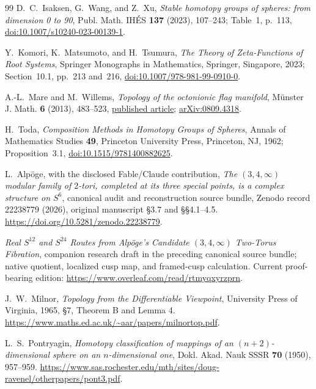 \documentclass[11pt]{article}
\theoremstyle{definition}
\begin{document}
\begin{thebibliography}{99}
D.~C.~Isaksen, G.~Wang, and Z.~Xu,
\emph{Stable homotopy groups of spheres: from dimension 0 to 90},
Publ. Math. IH\'ES \textbf{137} (2023), 107--243; Table~1, p.~113,
\href{https://doi.org/10.1007/s10240-023-00139-1}
{doi:10.1007/s10240-023-00139-1}.

Y.~Komori, K.~Matsumoto, and H.~Tsumura,
\emph{The Theory of Zeta-Functions of Root Systems},
Springer Monographs in Mathematics, Springer, Singapore, 2023;
Section~10.1, pp.~213 and~216,
\href{https://doi.org/10.1007/978-981-99-0910-0}
{doi:10.1007/978-981-99-0910-0}.

A.-L.~Mare and M.~Willems,
\emph{Topology of the octonionic flag manifold},
M\"unster J. Math. \textbf{6} (2013), 483--523,
\href{https://www.uni-muenster.de/FB10/mjm/vol_6/mjm_vol_6_14.pdf}
{published article};
\href{https://arxiv.org/abs/0809.4318}{arXiv:0809.4318}.

H.~Toda,
\emph{Composition Methods in Homotopy Groups of Spheres},
Annals of Mathematics Studies \textbf{49},
Princeton University Press, Princeton, NJ, 1962;
Proposition~3.1,
\href{https://doi.org/10.1515/9781400882625}
{doi:10.1515/9781400882625}.

L.~Alp\"oge, with the disclosed Fable/Claude contribution,
\emph{The \((3,4,\infty)\) modular family of \(2\)-tori, completed at
its three special points, is a complex structure on \(S^6\)},
canonical audit and reconstruction source bundle, Zenodo record 22238779
(2026), original manuscript \S3.7 and \S\S4.1--4.5.
\url{https://doi.org/10.5281/zenodo.22238779}.

\emph{Real \(S^{12}\) and \(S^{24}\) Routes from Alp\"oge's
Candidate \((3,4,\infty)\) Two-Torus Fibration},
companion research draft in the preceding canonical source bundle;
native quotient, localized cusp map, and framed-cusp calculation.
Current proof-bearing edition:
\url{https://www.overleaf.com/read/rtmyqxyrzprn}.

J.~W.~Milnor, \emph{Topology from the Differentiable Viewpoint},
University Press of Virginia, 1965, \S7, Theorem B and Lemma 4.
\url{https://www.maths.ed.ac.uk/~aar/papers/milnortop.pdf}.

L.~S.~Pontryagin,
\emph{Homotopy classification of mappings of an \((n+2)\)-dimensional
sphere on an \(n\)-dimensional one},
Dokl. Akad. Nauk SSSR \textbf{70} (1950), 957--959.
\url{https://www.sas.rochester.edu/mth/sites/doug-ravenel/otherpapers/pont3.pdf}.


\end{thebibliography}
\end{document}
